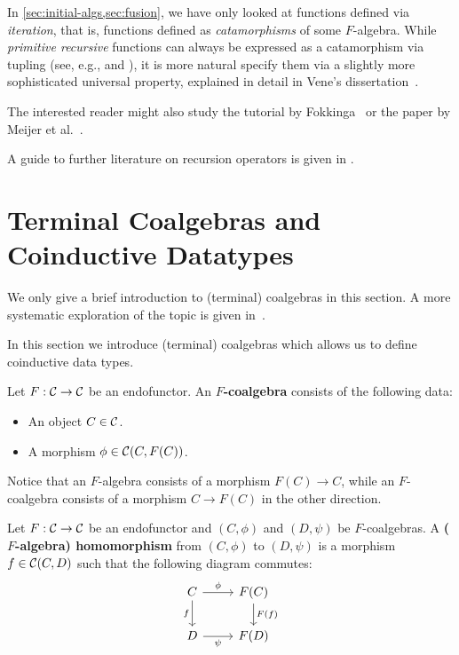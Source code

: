 \begin{reading*}
  In \cref{sec:initial-algs,sec:fusion}, we have only looked at functions defined via \emph{iteration}, that is, functions defined as \emph{catamorphisms} of some $F$-algebra.
  While \emph{primitive recursive} functions can always be expressed as a catamorphism via tupling (see, e.g., \cite[\S4]{DBLP:journals/jfp/Hutton99} and \cite[\S3.1]{vene_phd}), it is more natural specify them via a slightly more sophisticated universal property, explained in detail in Vene's dissertation~\cite[Chapter~3]{vene_phd}.

  The interested reader might also study the tutorial by Fokkinga~\cite{Fokkinga_homo-cata} or the paper by Meijer et al.~\cite{DBLP:conf/fpca/MeijerFP91}.
  
  A guide to further literature on recursion operators is given in \cite[\S6]{DBLP:journals/jfp/Hutton99}.
\end{reading*}

\section{Terminal Coalgebras and Coinductive Datatypes}


\begin{reading*}
  We only give a brief introduction to (terminal) coalgebras in this section.
  A more systematic exploration of the topic is given in~\cite{DBLP:conf/fpca/MeijerFP91}.
\end{reading*}


In this section we introduce (terminal) coalgebras which allows us to define coinductive data types.

\begin{dfn} Let $F:\mathcal{C}\to \mathcal{C}$ be an endofunctor. An \textbf{$F$-coalgebra} consists of the following data:
\begin{itemize}
\item An object $C\in \mathcal{C}$.
\item A morphism $\phi \in {\mathcal{C}}(C,F(C))$.
\end{itemize}
\end{dfn}
Notice that an $F$-algebra consists of a morphism $F(C)\to C$, while an $F$-coalgebra consists of a morphism $C\to F(C)$ in the other direction.

\begin{dfn} Let $F:\mathcal{C}\to \mathcal{C}$ be an endofunctor and $(C,\phi)$ and $(D,\psi)$ be $F$-coalgebras. A \textbf{($F$-algebra) homomorphism} from $(C,\phi)$ to $(D,\psi)$ is a morphism $f\in {\mathcal{C}}(C,D)$ such that the following diagram commutes:
\[
\begin{tikzcd}
C 
\arrow[r, "\phi"] 
\arrow[d,swap, "f"]
& F(C) 
\arrow[d, "F(f)"] 
\\
D
\arrow[r, swap, "\psi"] 
& F(D)
\end{tikzcd}
\]
\end{dfn}

